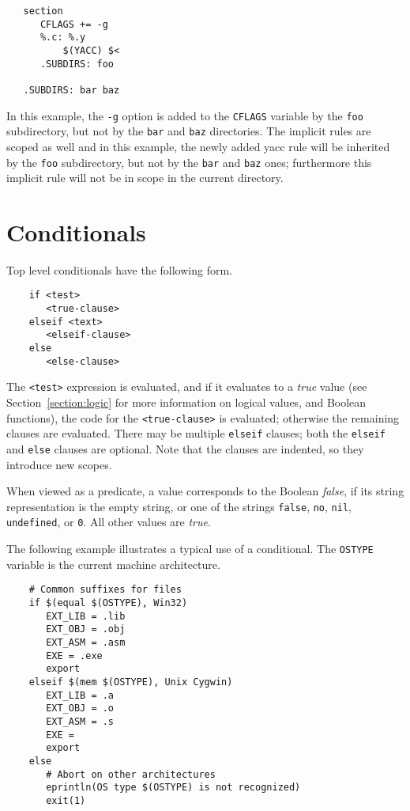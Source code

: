 \begin{verbatim}
   section
      CFLAGS += -g
      %.c: %.y
          $(YACC) $<
      .SUBDIRS: foo

   .SUBDIRS: bar baz
\end{verbatim}

In this example, the \verb+-g+ option is added to the \verb+CFLAGS+
variable by the \verb+foo+ subdirectory, but not by the \verb+bar+ and
\verb+baz+ directories. The implicit rules are scoped as well and in this
example, the newly added yacc rule will be inherited by the \verb+foo+
subdirectory, but not by the \verb+bar+ and \verb+baz+ ones; furthermore
this implicit rule will not be in scope in the current directory.

\section{Conditionals}
\label{section:conditionals}

Top level conditionals have the following form.

\begin{verbatim}
    if <test>
       <true-clause>
    elseif <text>
       <elseif-clause>
    else
       <else-clause>
\end{verbatim}

The \verb+<test>+ expression is evaluated, and if it evaluates to a \emph{true} value (see
Section~\ref{section:logic} for more information on logical values, and Boolean functions), the code
for the \verb+<true-clause>+ is evaluated; otherwise the remaining clauses are evaluated.  There may
be multiple \verb+elseif+ clauses; both the \verb+elseif+ and \verb+else+ clauses are optional.
Note that the clauses are indented, so they introduce new scopes.

When viewed as a predicate, a value corresponds to the Boolean \emph{false}, if its string
representation is the empty string, or one of the strings \verb+false+, \verb+no+, \verb+nil+,
\verb+undefined+, or \verb+0+.  All other values are \emph{true}.

The following example illustrates a typical use of a conditional.  The
\verb+OSTYPE+ variable is the current machine architecture.

\begin{verbatim}
    # Common suffixes for files
    if $(equal $(OSTYPE), Win32)
       EXT_LIB = .lib
       EXT_OBJ = .obj
       EXT_ASM = .asm
       EXE = .exe
       export
    elseif $(mem $(OSTYPE), Unix Cygwin)
       EXT_LIB = .a
       EXT_OBJ = .o
       EXT_ASM = .s
       EXE =
       export
    else
       # Abort on other architectures
       eprintln(OS type $(OSTYPE) is not recognized)
       exit(1)
\end{verbatim}

